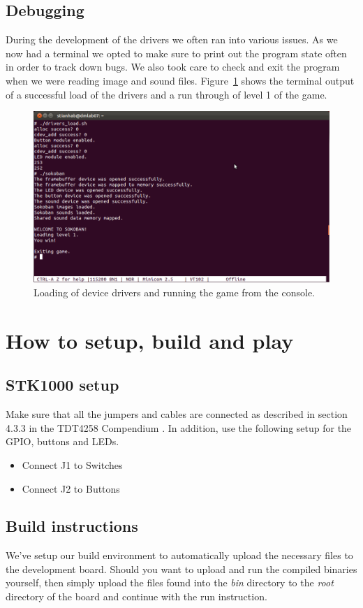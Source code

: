 \documentclass[a4paper,11pt]{article}
\begin{document}
\subsection{Debugging}
During the development of the drivers we often ran into various issues. As we now had a terminal we opted to make sure to print out the program state often in order to track down bugs. We also took care to check and exit the program when we were reading image and sound files. Figure~\ref{fig:consolestart} shows the terminal output of a successful load of the drivers and a run through of level 1 of the game.

\begin{figure}[H]
\centering
\includegraphics[scale=0.4]{images/consolestart.png}
\caption{Loading of device drivers and running the game from the console.}
\label{fig:consolestart}
\end{figure}

\section{How to setup, build and play}
\subsection{STK1000 setup}
Make sure that all the jumpers and cables are connected as described in section 4.3.3 in the TDT4258 Compendium \cite{komp}.
In addition, use the following setup for the GPIO, buttons and LEDs.

\begin{itemize}
\item Connect J1 to Switches
\item Connect J2 to Buttons
\end{itemize}

\subsection{Build instructions}
We've setup our build environment to automatically upload the necessary files to the development board. Should you want to upload and run the compiled binaries yourself, then simply upload the files found into the \textit{bin} directory to the \textit{root} directory of the board and continue with the run instruction.
\end{document}
